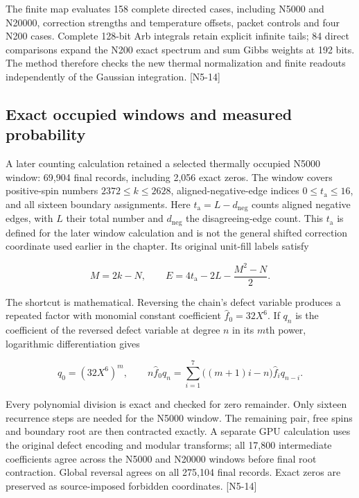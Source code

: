 The finite map evaluates 158 complete directed cases, including N5000 and N20000, correction strengths and temperature offsets, packet controls and four N200 cases. Complete 128-bit Arb integrals retain explicit infinite tails; 84 direct comparisons expand the N200 exact spectrum and sum Gibbs weights at 192 bits. The method therefore checks the new thermal normalization and finite readouts independently of the Gaussian integration. {[}N5-14{]}

\subsection{Exact occupied windows and measured probability}\label{exact-occupied-windows-and-measured-probability}

A later counting calculation retained a selected thermally occupied N5000 window: 69,904 final records, including 2,056 exact zeros. The window covers positive-spin numbers \(2372\le k\le2628\), aligned-negative-edge indices \(0\le t_{\mathrm{a}}\le16\), and all sixteen boundary assignments. Here \(t_{\mathrm{a}}=L-d_{\mathrm{neg}}\) counts aligned negative edges, with \(L\) their total number and \(d_{\mathrm{neg}}\) the disagreeing-edge count. This \(t_{\mathrm{a}}\) is defined for the later window calculation and is not the general shifted correction coordinate used earlier in the chapter. Its original unit-fill labels satisfy

\[M=2k-N,\qquad
E=4t_{\mathrm{a}}-2L-\frac{M^2-N}{2}.\]

The shortcut is mathematical. Reversing the chain's defect variable produces a repeated factor with monomial constant coefficient \(\widehat f_0=32X^6\). If \(q_n\) is the coefficient of the reversed defect variable at degree \(n\) in its \(m\)th power, logarithmic differentiation gives

\[q_0=(32X^6)^m,\qquad
n\widehat f_0q_n=\sum_{i=1}^{7}\bigl((m+1)i-n\bigr)\widehat f_iq_{n-i}.\]

Every polynomial division is exact and checked for zero remainder. Only sixteen recurrence steps are needed for the N5000 window. The remaining pair, free spins and boundary root are then contracted exactly. A separate GPU calculation uses the original defect encoding and modular transforms; all 17,800 intermediate coefficients agree across the N5000 and N20000 windows before final root contraction. Global reversal agrees on all 275,104 final records. Exact zeros are preserved as source-imposed forbidden coordinates. {[}N5-14{]}

